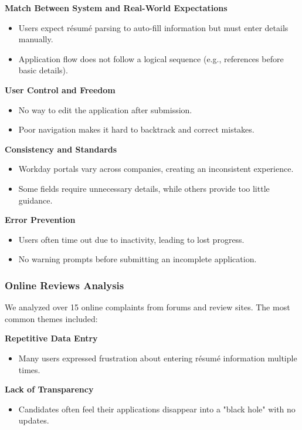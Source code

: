 \documentclass[
	letterpaper, %
]{jdf}
\begin{document}
\begin{sloppypar}
\textbf{Match Between System and Real-World Expectations}  
\begin{itemize}  
    \item Users expect résumé parsing to auto-fill information but must enter details manually.  
    \item Application flow does not follow a logical sequence (e.g., references before basic details).  
\end{itemize}  


\textbf{User Control and Freedom}  
\begin{itemize}  
    \item No way to edit the application after submission.  
    \item Poor navigation makes it hard to backtrack and correct mistakes.  
\end{itemize}   

\textbf{Consistency and Standards}  
\begin{itemize}  
    \item Workday portals vary across companies, creating an inconsistent experience.  
    \item Some fields require unnecessary details, while others provide too little guidance.  
\end{itemize}  

\textbf{Error Prevention}  
\begin{itemize}  
    \item Users often time out due to inactivity, leading to lost progress.  
    \item No warning prompts before submitting an incomplete application.  
\end{itemize}   

\subsubsection*{Online Reviews Analysis}  

We analyzed over 15 online complaints from forums and review sites. The most common themes included:  

\textbf{Repetitive Data Entry}  
\begin{itemize}  
    \item Many users expressed frustration about entering résumé information multiple times.  
\end{itemize}   

\textbf{Lack of Transparency}  
\begin{itemize}  
    \item Candidates often feel their applications disappear into a "black hole" with no updates.  
\end{itemize}   


\end{sloppypar}
\end{document}
